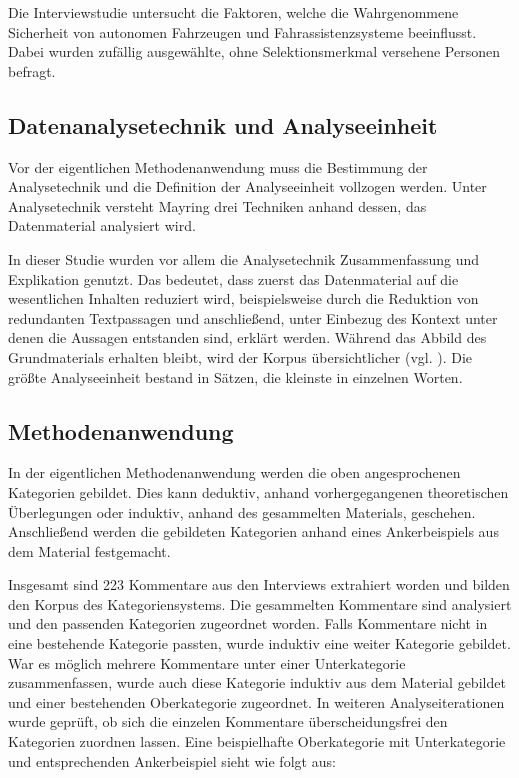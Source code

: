 \documentclass[12pt]{article}
\begin{document}
Die Interviewstudie untersucht die Faktoren, welche die Wahrgenommene Sicherheit von autonomen Fahrzeugen und Fahrassistenzsysteme beeinflusst. Dabei wurden zufällig ausgewählte, ohne Selektionsmerkmal versehene Personen befragt.

\subsection{Datenanalysetechnik und Analyseeinheit}
Vor der eigentlichen Methodenanwendung muss die \glq Bestimmung der Analysetechnik\grq{} und die \glq Definition der Analyseeinheit\grq{} vollzogen werden. Unter Analysetechnik versteht Mayring drei Techniken anhand dessen, das Datenmaterial analysiert wird.

In dieser Studie wurden vor allem die Analysetechnik \glq Zusammenfassung\grq{} und \glq Explikation\grq{} genutzt. Das bedeutet, dass zuerst das Datenmaterial auf die wesentlichen Inhalten reduziert wird, beispielsweise durch die Reduktion von redundanten Textpassagen und anschließend, unter Einbezug des Kontext unter denen die Aussagen entstanden sind, erklärt werden. Während das \glq Abbild des Grundmaterials\grq{} erhalten bleibt, wird der Korpus übersichtlicher (vgl. \cite[115]{mayring2010qualitative}). Die größte Analyseeinheit bestand in Sätzen, die kleinste in einzelnen Worten.

\subsection{Methodenanwendung}
In der eigentlichen Methodenanwendung werden die oben angesprochenen Kategorien gebildet. Dies kann deduktiv, anhand vorhergegangenen theoretischen Überlegungen oder induktiv, anhand des gesammelten Materials, geschehen. Anschließend werden die gebildeten Kategorien anhand eines Ankerbeispiels aus dem Material festgemacht.

Insgesamt sind 223 Kommentare aus den Interviews extrahiert worden und bilden den Korpus des Kategoriensystems. Die gesammelten Kommentare sind analysiert und den passenden Kategorien zugeordnet worden. Falls Kommentare nicht in eine bestehende Kategorie passten, wurde induktiv eine weiter Kategorie gebildet. War es möglich mehrere Kommentare unter einer Unterkategorie zusammenfassen, wurde auch diese Kategorie induktiv aus dem Material gebildet und einer bestehenden Oberkategorie zugeordnet. In weiteren Analyseiterationen wurde geprüft, ob sich die einzelen Kommentare überscheidungsfrei den Kategorien zuordnen lassen. Eine beispielhafte Oberkategorie mit Unterkategorie und entsprechenden Ankerbeispiel sieht wie folgt aus:
\end{document}
